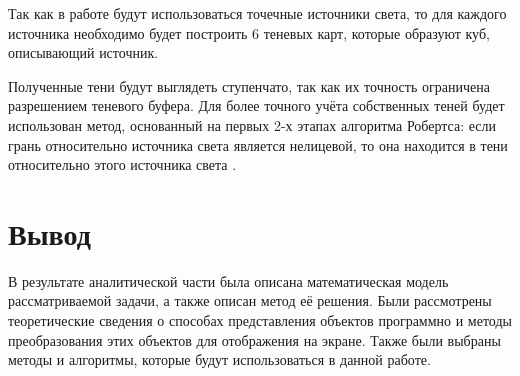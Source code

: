 Так как в работе будут использоваться точечные источники света, то для каждого источника необходимо будет построить 6 теневых карт, которые образуют куб, описывающий источник.

Полученные тени будут выглядеть ступенчато, так как их точность ограничена разрешением теневого буфера. Для более точного учёта собственных теней будет использован метод, основанный на первых 2-х этапах алгоритма Робертса: если грань относительно источника света является нелицевой, то она находится в тени относительно этого источника света \cite{rodgers}.

\section*{Вывод}

В результате аналитической части была описана математическая модель рассматриваемой задачи, а также описан метод её решения. Были рассмотрены теоретические сведения о способах представления объектов программно и методы преобразования этих объектов для отображения на экране. Также были выбраны методы и алгоритмы, которые будут использоваться в данной работе.

\clearpage
